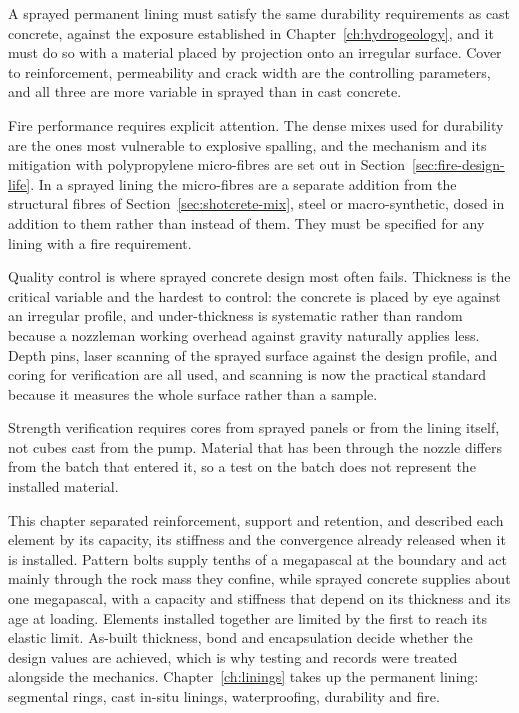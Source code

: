 A sprayed permanent lining must satisfy the same durability requirements as
cast concrete, against the exposure established in
Chapter~\ref{ch:hydrogeology}, and it must do so with a material placed by
projection onto an irregular surface. Cover to reinforcement, permeability and
crack width are the controlling parameters, and all three are more variable in
sprayed than in cast concrete.

Fire performance requires explicit attention. The dense mixes used for
durability are the ones most vulnerable to explosive spalling, and the
mechanism and its mitigation with polypropylene micro-fibres are set out in
Section~\ref{sec:fire-design-life}. In a sprayed lining the micro-fibres are
a separate addition from the structural fibres of
Section~\ref{sec:shotcrete-mix}, steel or macro-synthetic, dosed in addition
to them rather than instead of them. They must be specified for any lining
with a fire requirement.

Quality control is where sprayed concrete design most often fails. Thickness
is the critical variable and the hardest to control: the concrete is placed
by eye against an irregular profile, and under-thickness is systematic rather than
random because a nozzleman working overhead against gravity naturally applies
less. Depth pins, laser scanning of the sprayed surface against the design
profile, and coring for verification are all used, and scanning is now the
practical standard because it measures the whole surface rather than a sample.

Strength verification requires cores from sprayed panels or from the lining
itself, not cubes cast from the pump. Material that has been through the
nozzle differs from the batch that entered it, so a test on the batch does not
represent the installed material.

This chapter separated reinforcement, support and retention, and described
each element by its capacity, its stiffness and the convergence already
released when it is installed. Pattern bolts supply tenths of a megapascal at
the boundary and act mainly through the rock mass they confine, while sprayed
concrete supplies about one megapascal, with a capacity and stiffness that
depend on its thickness and its age at loading. Elements installed together
are limited by the first to reach its elastic limit. As-built thickness, bond
and encapsulation decide whether the design values are achieved, which is why
testing and records were treated alongside the mechanics.
Chapter~\ref{ch:linings} takes up the permanent lining: segmental rings, cast
in-situ linings, waterproofing, durability and fire.

\chapterreferences
